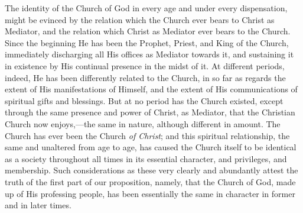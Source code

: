 \documentclass[
  english,
]{book}
\begin{document}
\begin{enumerate}
  The identity of the Church of God in every age and under every dispensation, might be evinced by the relation which the Church ever bears to Christ as Mediator, and the relation which Christ as Mediator ever bears to the Church. Since the beginning He has been the Prophet, Priest, and King of the Church, immediately discharging all His offices as Mediator towards it, and sustaining it in existence by His continual presence in the midst of it. At different periods, indeed, He has been differently related to the Church, in so far as regards the extent of His manifestations of Himself, and the extent of His communications of spiritual gifts and blessings. But at no period has the Church existed, except through the same presence and power of Christ, as Mediator, that the Christian Church now enjoys,---the same in nature, although different in amount. The Church has ever been the Church \emph{of Christ}; and this spiritual relationship, the same and unaltered from age to age, has caused the Church itself to be identical as a society throughout all times in its essential character, and privileges, and membership. Such considerations as these very clearly and abundantly attest the truth of the first part of our proposition, namely, that the Church of God, made up of His professing people, has been essentially the same in character in former and in later times.
\end{enumerate}
\end{document}
